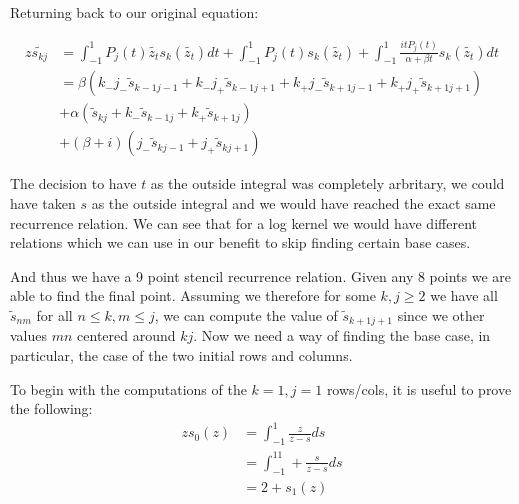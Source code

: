 \documentclass{article}
\begin{document}
Returning back to our original equation:

\begin{align}
    z\tilde{s_{kj}}&=\int_{-1}^1P_j(t)\tilde{z_t}s_k(\tilde{z_t})dt
    +\int_{-1}^1P_j(t)s_k(\tilde{z_t})
    +\int_{-1}^1\frac{itP_j(t)}{\alpha+\beta t}s_k(\tilde{z_t})dt\\
    &=\beta(k_-j_-\tilde{s}_{k-1j-1}+k_-j_+\tilde{s}_{k-1j+1}+k_+j_-\tilde{s}_{k+1j-1}+k_+j_+\tilde{s}_{k+1j+1})\\
    &+\alpha(\tilde{s}_{kj}+k_-\tilde{s}_{k-1j}+k_+\tilde{s}_{k+1j})\\
    &+(\beta+i)(j_-\tilde{s}_{kj-1}+j_+\tilde{s}_{kj+1})
\end{align}

The decision to have $t$ as the outside integral was completely arbritary, we could have taken $s$ as the outside integral and we would have reached the exact same recurrence relation.
We can see that for a log kernel we would have different relations which we can use in our benefit to skip finding certain base cases.

And thus we have a 9 point stencil recurrence relation.
Given any 8 points we are able to find the final point.
Assuming we therefore for some $k,j\geq 2$ we have all $\tilde{s}_{nm}$ for all $n\leq k,m\leq j$,
we can compute the value of $\tilde{s}_{k+1j+1}$ since we other values $mn$ centered around $kj$.
Now we need a way of finding the base case, in particular, the case of the two initial rows and columns.

To begin with the computations of the $k=1,j=1$ rows/cols, it is useful to prove the following:
\begin{align}
    zs_0(z)&=\int_{-1}^1\frac{z}{z-s}ds \\
    &= \int_{-1}^11+\frac{s}{z-s}ds\\
    &= 2+s_1(z)
\end{align}
\end{document}

